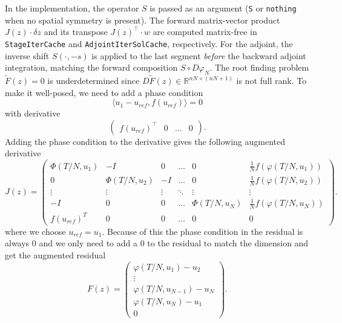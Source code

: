 \documentclass[11pt,a4paper]{article}
\begin{document}
In the implementation, the operator $S$ is passed as an argument (\texttt{S} or \texttt{nothing} when no spatial symmetry is present).  The forward matrix-vector product $J(z)\cdot\delta z$ and its transpose $J(z)^\top \cdot w$ are computed matrix-free in \texttt{Stage\-Iter\-Cache} and \texttt{AdjointIterSolCache}, respectively.  For the adjoint, the inverse shift $S(\cdot, -s)$ is applied to the last segment \emph{before} the backward adjoint integration, matching the forward composition $S \circ D\varphi_N$.
The root finding problem $\tilde{F}(z) = 0$ is underdetermined since $D\tilde{F}(z)\in\mathbb{R}^{nN\times (nN+1)}$ is not full rank. To make it well-posed, we need to add a phase condition \begin{equation*}
    \langle u_1 - u_{ref}, f(u_{ref}) \rangle = 0
\end{equation*}
with derivative
\begin{equation*}
    \begin{pmatrix} f(u_{ref})^\top & 0 & \dots & 0 \end{pmatrix}.
\end{equation*} 
Adding the phase condition to the derivative gives the following augmented derivative
\begin{equation*}
    J(z)=\begin{pmatrix} \Phi(T/N,u_1) & -I & 0 & \dots & 0 & \frac{1}{N}f(\varphi(T/N,u_1)) \\ 0 & \Phi(T/N,u_2) & -I & \dots & 0 & \frac{1}{N}f(\varphi(T/N,u_2)) \\ \vdots & \vdots & \vdots & \ddots & \vdots & \vdots \\ -I & 0 & 0 & \dots & \Phi(T/N,u_N) & \frac{1}{N}f(\varphi(T/N,u_N))\\
        f(u_{ref})^T & 0 & 0 & \dots & 0 & 0 \end{pmatrix}.
\end{equation*}
where we choose $u_{ref} = u_1$.
Because of this the phase condition in the residual is always $0$ and we only need to add a $0$ to the residual to match the dimension and get the augmented residual
\begin{equation*}
    F(z) = \begin{pmatrix} \varphi(T/N,u_1)-u_2 \\ \vdots \\ \varphi(T/N,u_{N-1})-u_N \\ \varphi(T/N,u_N)-u_1 \\ 0 \end{pmatrix}.
\end{equation*}
\end{document}
